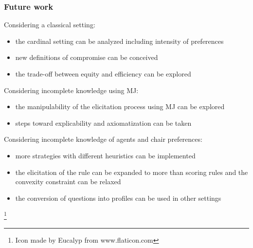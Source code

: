 \documentclass{beamer}
\begin{document}
\begin{frame}
	\frametitle{Future work}
	\begin{block}{Considering a classical setting:}
		\begin{itemize}
			\item the cardinal setting can be analyzed including intensity of preferences
			\item new definitions of compromise can be conceived
			\item the trade-off between equity and efficiency can be explored
		\end{itemize}
	\end{block}
	\begin{block}{Considering incomplete knowledge using MJ:}
		\begin{itemize}
			\item the manipulability of the elicitation process using MJ can be explored
			\item steps toward explicability and axiomatization can be taken
		\end{itemize}
	\end{block}
	\begin{block}{Considering incomplete knowledge of agents and chair preferences:}
		\begin{itemize}
			\item more strategies with different heuristics can be implemented
			\item the elicitation of the rule can be expanded to more than scoring rules and the convexity constraint can be relaxed
			\item the conversion of questions into profiles can be used in other settings
		\end{itemize}	
	\end{block}
\end{frame}

\addtocounter{framenumber}{-1}
\begin{frame}[plain]
	{\let\thefootnote\relax\footnote{\tiny Icon made by Eucalyp from www.flaticon.com}}
\end{frame}
\end{document}
